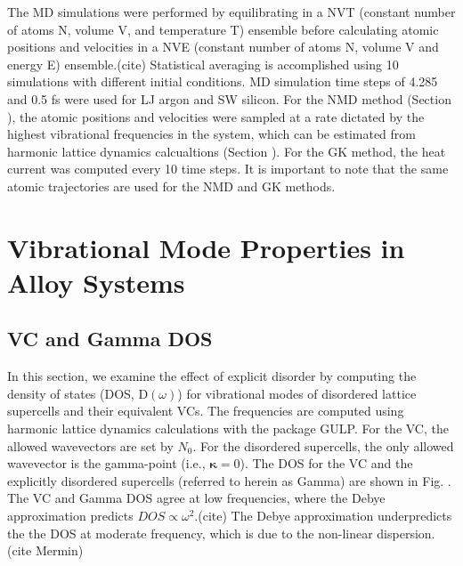 \documentclass[aps,prb,twocolumn,superscriptaddress,amsmath,amssymb,floatfix]{revtex4}
\begin{document}
The MD simulations were performed by equilibrating in a NVT (constant 
number of atoms N, volume V, and temperature T) ensemble before 
calculating atomic positions and velocities in a NVE 
(constant number of 
atoms N, volume V and energy E) ensemble.(cite)  
Statistical averaging is accomplished 
using 10 simulations with different initial conditions. MD simulation 
time steps of 
4.285 and 0.5 fs were used for LJ argon and SW silicon. 
For the NMD method (Section ), the atomic positions 
and velocities were sampled at a rate dictated by the highest vibrational 
frequencies in the system, which can be estimated from harmonic lattice 
dynamics calcualtions (Section ). For the GK method, the heat current 
was computed every 10 time steps. It is important to note that the same 
atomic trajectories are used for the NMD and GK methods. 

\section{\label{S:Vibrational}
Vibrational Mode Properties in Alloy Systems}

\subsection{\label{S:VC Gamma DOS}VC and Gamma DOS}

In this section, we examine the effect of explicit disorder by computing 
the density of states (DOS, D$(\omega)$) for vibrational modes of  
disordered lattice supercells and their 
equivalent VCs. The frequencies 
are computed using harmonic lattice dynamics calculations with the package 
GULP.\cite{gale_general_2003} For the 
VC, the allowed wavevectors are set by $N_0$. For the disordered supercells,
the only allowed wavevector is the gamma-point (i.e., $\pmb{\kappa}=0$). 
The DOS for the VC and the explicitly disordered supercells 
(referred to herein as Gamma) are shown in Fig. . The VC and Gamma DOS 
agree at low frequencies, where the Debye approximation predicts 
$DOS \propto \omega^2$.(cite) The Debye approximation 
underpredicts the the DOS at moderate frequency, which is due to the 
non-linear dispersion.(cite Mermin)
\end{document}
